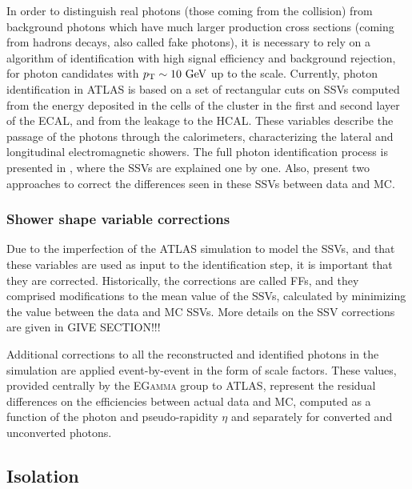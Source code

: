 In order to distinguish real photons (those coming from the collision) from background photons which have much larger production cross sections (coming from hadrons decays, also called fake photons), it is necessary to rely on a algorithm of identification with high signal efficiency and background rejection, for photon candidates with \(p_{\text{T}} \sim 10~\text{GeV}\) up to the \tev scale. 
Currently, photon identification in ATLAS is based on a set of rectangular cuts on \acp{SSV} computed from the energy deposited in the cells of the cluster in the first and second layer of the \ac{ECAL}, and from the leakage to the \ac{HCAL}. These variables describe the passage of the photons through the calorimeters, characterizing the lateral and longitudinal electromagnetic showers.
The full photon identification process is presented in \Ch{\ref{ch:pid_ss}}, where the \acp{SSV} are explained one by one. Also, \Chs{\ref{ch:ffs}}{\ref{ch:cellrw}} present two approaches to correct the differences seen in these \acp{SSV} between data and \ac{MC}.



\subsubsection{Shower shape variable corrections}

Due to the imperfection of the \ac{ATLAS} simulation to model the \acp{SSV}, and that these variables are used as input to the identification step, it is important that they are corrected. Historically, the corrections are called \acp{FF}, and they comprised modifications to the mean value of the \acp{SSV}, calculated by minimizing the \chisq value between the data and \ac{MC} \acp{SSV}.
More details on the \ac{SSV} corrections are given in GIVE SECTION!!!

Additional corrections to all the reconstructed and identified photons in the simulation are applied event-by-event in the form of scale factors. These values, provided centrally by the \textsc{EGamma} group to \ac{ATLAS}, represent the residual differences on the efficiencies between actual data and \ac{MC}, computed as a function of the photon \pt and pseudo-rapidity \(\eta\) and separately for converted and unconverted photons.








\subsection{Isolation}
\label{subsec:objects:egamma:iso}

